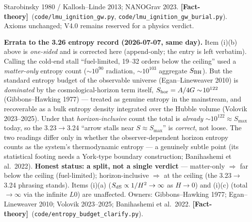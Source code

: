 \documentclass[11pt]{article}
\newcommand{\factth}{\textcolor{green!40!black}{\textbf{[Fact-theory]}}}
\begin{document}
{Starobinsky 1980 / Kallosh--Linde 2013; NANOGrav 2023. \factth\ (\texttt{code/lmu\_ignition\_gw.py}, \texttt{code/lmu\_ignition\_gw\_burial.py}). Axioms unchanged; V4.0 remains reserved for a physics verdict.

\smallskip\noindent\textbf{Errata to the 3.26 entropy record (2026-07-07, same day).} Item (i)(b) above is \emph{one-sided} and is corrected here (append-only; the entry is left verbatim). Calling the cold-end stall ``fuel-limited, 19--32 orders below the ceiling'' used a \emph{matter-only} entropy count ($\sim\!10^{90}$ radiation, $\sim\!10^{103}$ aggregate $S_{\rm BH}$). But the standard entropy budget of the observable universe (Egan--Lineweaver 2010) is \emph{dominated} by the cosmological-horizon term itself, $S_{\rm hor}=A/4G\sim\!10^{122}$ (Gibbons--Hawking 1977) --- treated as genuine entropy in the mainstream, and recoverable as a bulk entropy density integrated over the Hubble volume (Volovik 2023--2025). Under that \emph{horizon-inclusive} count the total is \emph{already} $\sim\!10^{122}\approx S_{\max}$ today, so the 3.23$\to$3.24 ``arrow stalls near $S\!\approx\!S_{\max}$'' is \emph{correct}, not loose. The two readings differ only in whether the observer-dependent horizon entropy counts as the system's thermodynamic entropy --- a genuinely subtle point (its statistical footing needs a York-type boundary construction; Banihashemi et al.\ 2022). \textbf{Honest status: a split, not a single verdict} --- matter-only $\Rightarrow$ far below the ceiling (fuel-limited); horizon-inclusive $\Rightarrow$ at the ceiling (the 3.23$\to$3.24 phrasing stands). Items (i)(a) ($S_{\rm dS}\propto1/H^2\to\infty$ as $H\to0$) and (i)(c) (total $\to\infty$ via the infinite $L0$) are unaffected. Owners: Gibbons--Hawking 1977; Egan--Lineweaver 2010; Volovik 2023--2025; Banihashemi et al.\ 2022. \factth\ (\texttt{code/entropy\_budget\_clarify.py}).

}
\end{document}
